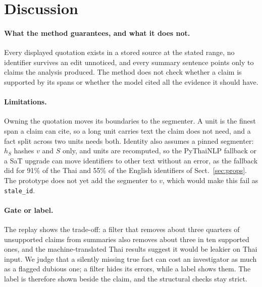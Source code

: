 \documentclass[runningheads]{llncs}
\begin{document}
\section{Discussion}\label{sec:discussion}

\paragraph{What the method guarantees, and what it does not.}
Every displayed quotation exists in a stored source at the stated range, no identifier survives an
edit unnoticed, and every summary sentence points only to claims the analysis produced. The method does
not check whether a claim is supported by its spans or whether the model cited all the evidence it
should have.

\paragraph{Limitations.}
Owning the quotation moves its boundaries to the segmenter. A unit is the finest span a claim can
cite, so a long unit carries text the claim does not need, and a fact split across two units needs
both. Identity also assumes a pinned segmenter: $h_S$ hashes $v$ and $S$ only, and units are
recomputed, so the PyThaiNLP fallback or a SaT upgrade can move identifiers to other text without an
error, as the fallback did for 91\% of the Thai and 55\% of the English identifiers of
Sect.~\ref{sec:props}. The prototype does not
yet add the segmenter to $v$, which would make this fail as \texttt{stale\_id}.

\paragraph{Gate or label.}
The replay shows the trade-off: a filter that removes about three quarters of unsupported claims from
summaries also removes about three in ten supported ones, and the machine-translated Thai results
suggest it would be leakier on Thai input. We judge that a silently missing true fact can cost an investigator as much as a flagged
dubious one; a filter hides its errors, while a label shows them. The label is therefore shown beside the
claim, and the structural checks stay strict.
\end{document}
